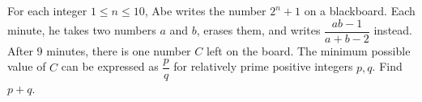 For each integer $1 \le n \le 10$, Abe writes the number $2^n + 1$ on a blackboard. Each minute, he takes two numbers $a$ and $b$, erases them, and writes $\dfrac{ab-1}{a+b-2}$ instead. After $9$ minutes, there is one number $C$ left on the board. The minimum possible value of $C$ can be expressed as $\dfrac{p}{q}$ for relatively prime positive integers $p, q$. Find $p + q$.
